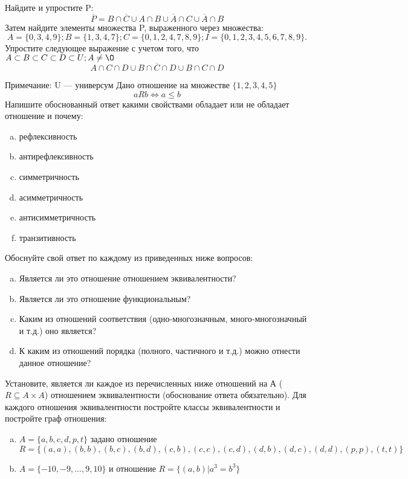 \documentclass[10pt]{exam}
\begin{document}
\begin{questions}
\question
Найдите и упростите P:
\begin{equation*}
\overline{P} = B \cap \overline{C} \cup A \cap B \cup \overline{A} \cap C \cup \overline{A} \cap B
\end{equation*}
Затем найдите элементы множества P, выраженного через множества:
\begin{equation*}
A = \{0, 3, 4, 9\}; 
B = \{1, 3, 4, 7\};
C = \{0, 1, 2, 4, 7, 8, 9\};
I = \{0, 1, 2, 3, 4, 5, 6, 7, 8, 9\}.
\end{equation*}\question
Упростите следующее выражение с учетом того, что $A\subset B \subset C \subset D \subset U; A \neq \O$
\begin{equation*}
A \cap C  \cap D \cup B \cap \overline{C} \cap D \cup B \cap C \cap D
\end{equation*}

Примечание: U — универсум\question
Дано отношение на множестве $\{1, 2, 3, 4, 5\}$ 
\begin{equation*}
aRb \iff a \leq b
\end{equation*}
Напишите обоснованный ответ какими свойствами обладает или не обладает отношение и почему:   
\begin{enumerate} [a)]\setcounter{enumi}{0}
\item рефлексивность
\item антирефлексивность
\item симметричность
\item асимметричность
\item антисимметричность
\item транзитивность
\end{enumerate}

Обоснуйте свой ответ по каждому из приведенных ниже вопросов:
\begin{enumerate} [a)]\setcounter{enumi}{0}
    \item Является ли это отношение отношением эквивалентности?
    \item Является ли это отношение функциональным?
    \item Каким из отношений соответствия (одно-многозначным, много-многозначный и т.д.) оно является?
    \item К каким из отношений порядка (полного, частичного и т.д.) можно отнести данное отношение?
\end{enumerate}


\question
Установите, является ли каждое из перечисленных ниже отношений на А ($R \subseteq A \times A$) отношением эквивалентности (обоснование ответа обязательно). Для каждого отношения эквивалентности постройте классы 
эквивалентности и постройте граф отношения:
\begin{enumerate} [a)]\setcounter{enumi}{0}
\item $A = \{a, b, c, d, p, t\}$ задано отношение $R = \{(a, a), (b, b), (b, c), (b, d), (c, b), (c, c), (c, d), (d, b), (d, c), (d, d), (p,p), (t,t)\}$
\item $A = \{-10, -9, … , 9, 10\}$ и отношение $R = \{(a,b)|a^{3} = b^{3}\}$


\end{enumerate}
\end{questions}
\end{document}
